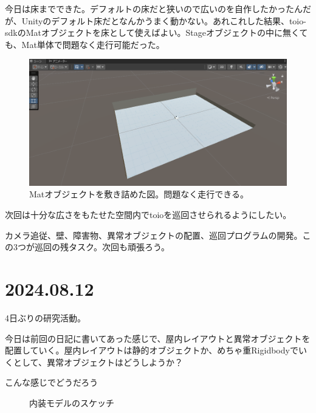 \documentclass[twocolumn]{mynote}
\begin{document}
今日は床までできた。デフォルトの床だと狭いので広いのを自作したかったんだが、Unityのデフォルト床だとなんかうまく動かない。あれこれした結果、toio-sdkのMatオブジェクトを床として使えばよい。Stageオブジェクトの中に無くても、Mat単体で問題なく走行可能だった。

\begin{figure}[h]
  \centering
  \includegraphics[keepaspectratio, width=0.8\columnwidth]{resources/2024-08-09-mat.png}
  \caption[short]{Matオブジェクトを敷き詰めた図。問題なく走行できる。}
  \label{fig:20240809-mat}
\end{figure}

次回は十分な広さをもたせた空間内でtoioを巡回させられるようにしたい。

カメラ追従、壁、障害物、異常オブジェクトの配置、巡回プログラムの開発。この3つが巡回の残タスク。次回も頑張ろう。

\section*{2024.08.12}
4日ぶりの研究活動。

今日は前回の日記に書いてあった感じで、屋内レイアウトと異常オブジェクトを配置していく。屋内レイアウトは静的オブジェクトか、めちゃ重Rigidbodyでいくとして、異常オブジェクトはどうしようか？

こんな感じでどうだろう

\fboxsep=0pt             %
\fboxrule=1pt            %
\begin{figure}[h]
  \centering
  \caption{内装モデルのスケッチ}
  \label{fig:interior-sketch}
\end{figure}
\end{document}
